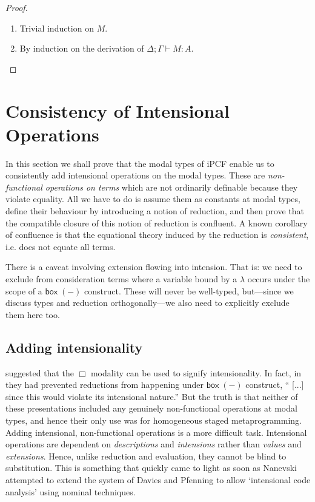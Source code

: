 \documentclass{myifcolog}
\theoremstyle{definition}
\newcommand{\ctxt}[2]{#1\mathbin{;}#2}
\newcommand{\ibox}[1]{\mathsf{box\;}#1}
\begin{document}
\begin{proof} \hfill
  \begin{enumerate}
    \item
      Trivial induction on $M$.
    \item
      By induction on the derivation of $\ctxt{\Delta}{\Gamma}
      \vdash M : A$.
  \end{enumerate}
\end{proof}


\section{Consistency of Intensional Operations}
  \label{sec:ipcfconfl}

In this section we shall prove that the modal types of iPCF enable
us to consistently add intensional operations on the modal types.
These are \emph{non-functional operations on terms} which are not
ordinarily definable because they violate equality.  All we have
to do is assume them as constants at modal types, define their
behaviour by introducing a notion of reduction, and then
prove that the compatible closure of this notion of reduction is
confluent. A known corollary of confluence is that the equational
theory induced by the reduction is \emph{consistent}, i.e. does
not equate all terms.

There is a caveat involving extension flowing into intension. That
is: we need to exclude from consideration terms where a variable
bound by a $\lambda$ occurs under the scope of a $\ibox{(-)}$
construct. These will never be well-typed, but---since we discuss
types and reduction orthogonally---we also need to explicitly
exclude them here too.

\subsection{Adding intensionality}

 \cite{Davies2001} suggested that
the $\Box$ modality can be used to signify intensionality. In
fact, in \cite{Davies2001,Davies2001a} they had prevented
reductions from happening under $\ibox{(-)}$ construct, `` [...]
since this would violate its intensional nature.'' But the truth
is that neither of these presentations included any genuinely
non-functional operations at modal types, and hence their only use
was for homogeneous staged metaprogramming. Adding intensional,
non-functional operations is a more difficult task. Intensional
operations are dependent on \emph{descriptions} and
\emph{intensions} rather than \emph{values} and \emph{extensions}.
Hence, unlike reduction and evaluation, they cannot be blind to
substitution. This is something that quickly came to light as soon
as Nanevski \cite{Nanevski2002} attempted to extend the system of
Davies and Pfenning to allow `intensional code analysis' using
nominal techniques.
\end{document}
